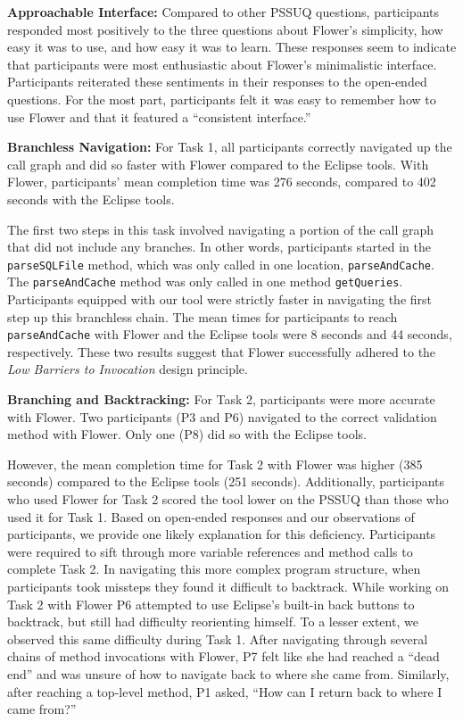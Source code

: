 \documentclass[conference]{IEEEtran}
\begin{document}
\textbf{Approachable Interface:}
Compared to other PSSUQ questions, participants responded most positively to the three questions about Flower's simplicity, how easy it was to use, and how easy it was to learn. 
These responses seem to indicate that participants were most enthusiastic about Flower's minimalistic interface. 
Participants reiterated these sentiments in their responses to the open-ended questions. 
For the most part, participants felt it was easy to remember how to use Flower and that it featured a ``consistent interface.''

\textbf{Branchless Navigation:}
For Task 1, all participants correctly navigated up the call graph and did so faster with Flower  compared to the Eclipse tools.
With Flower, participants' mean completion time was 276 seconds, compared to 402 seconds with the Eclipse tools.

The first two steps in this task involved navigating a portion of the call graph that did not include any branches.
In other words, participants started in the \texttt{parseSQLFile} method, which was only called in one location, \texttt{parseAndCache}. 
The \texttt{parseAndCache} method was only called in one method \texttt{getQueries}.
Participants equipped with our tool were strictly faster in navigating the first step up this branchless chain. 
The mean times for participants to reach \texttt{parseAndCache} with Flower and the Eclipse tools were 8 seconds and 44 seconds, respectively.
These two results suggest that Flower successfully adhered to the \textit{Low Barriers to Invocation} design principle. 

\textbf{Branching and Backtracking:}
For Task 2, participants were more accurate with Flower.
Two participants (P3 and P6) navigated to the correct validation method with Flower.
Only one (P8) did so with the Eclipse tools.

However, the mean completion time for Task 2 with Flower was higher (385 seconds) compared to the Eclipse tools (251 seconds).
Additionally, participants who used Flower  for Task 2 scored the tool lower on the PSSUQ than those who used it for Task 1.
Based on open-ended responses and our observations of participants, we provide one likely explanation for this deficiency.
Participants were required to sift through more variable references and method calls to complete Task 2.
In navigating this more complex program structure, when participants took missteps they found it difficult to backtrack.
While working on Task 2 with Flower P6 attempted to use Eclipse's built-in back buttons to backtrack, but still had difficulty reorienting himself. 
To a lesser extent, we observed this same difficulty during Task 1.
After navigating through several chains of method invocations with Flower, P7 felt like she had reached a ``dead end'' and was unsure of how to navigate back to where she came from.
Similarly, after reaching a top-level method, P1 asked, ``How can I return back to where I came from?''
\end{document}
